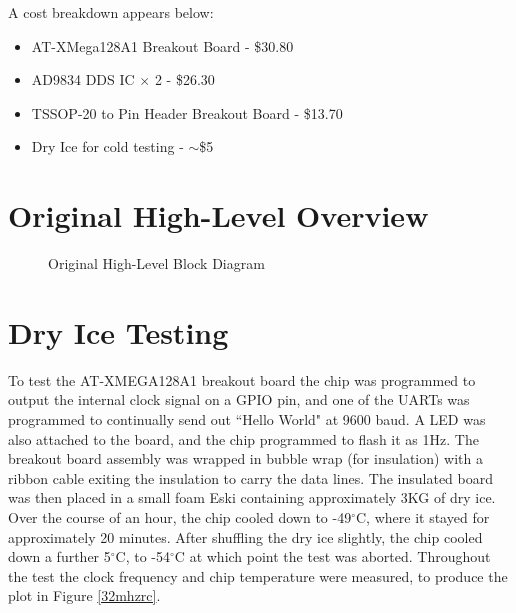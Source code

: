 \documentclass[a4paper,12pt]{article}
\begin{document}
A cost breakdown appears below:
\begin{itemize}
\item AT-XMega128A1 Breakout Board - \$30.80
\item AD9834 DDS IC $\times$ 2 - \$26.30
\item TSSOP-20 to Pin Header Breakout Board - \$13.70
\item Dry Ice for cold testing - $\sim$\$5
\end{itemize}

\newpage
\begin{appendices}
\section{Original High-Level Overview}
\begin{figure}[h!]
\begin{center}
\caption{Original High-Level Block Diagram}
\label{block_diag}
\end{center}
\end{figure}

\newpage
\section{Dry Ice Testing}
To test the AT-XMEGA128A1 breakout board the chip was programmed to output the internal clock signal on a GPIO pin, and one of the UARTs was programmed to continually send out ``Hello World" at 9600 baud. A LED was also attached to the board, and the chip programmed to flash it as 1Hz. The breakout board assembly was wrapped in bubble wrap (for insulation) with a ribbon cable exiting the insulation to carry the data lines. The insulated board was then placed in a small foam Eski containing approximately 3KG of dry ice. Over the course of an hour, the chip cooled down to -49$^\circ$C, where it stayed for approximately 20 minutes. After shuffling the dry ice slightly, the chip cooled down a further 5$^\circ$C, to -54$^\circ$C at which point the test was aborted. Throughout the test the clock frequency and chip temperature were measured, to produce the plot in Figure \ref{32mhzrc}.



\end{appendices}
\end{document}
